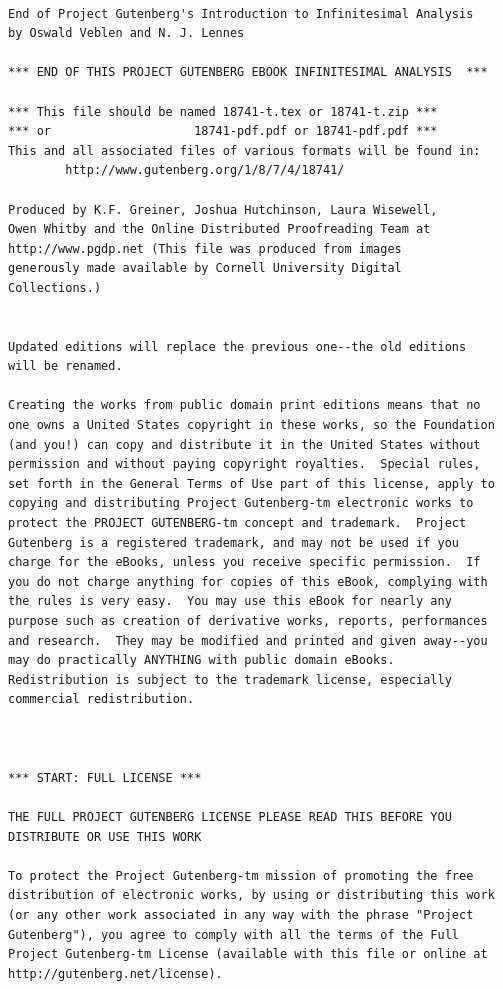 \documentclass[a4paper,12pt]{book}[2004/02/16]
\theoremstyle{ilemma}
\theoremstyle{itheorem}
\theoremstyle{iother}
\theoremstyle{icorollary}
\theoremstyle{numcorollary}
\theoremstyle{idefinition}
\begin{document}
\small
{}
\begin{verbatim}

End of Project Gutenberg's Introduction to Infinitesimal Analysis
by Oswald Veblen and N. J. Lennes

*** END OF THIS PROJECT GUTENBERG EBOOK INFINITESIMAL ANALYSIS  ***

*** This file should be named 18741-t.tex or 18741-t.zip ***
*** or                    18741-pdf.pdf or 18741-pdf.pdf ***
This and all associated files of various formats will be found in:
        http://www.gutenberg.org/1/8/7/4/18741/

Produced by K.F. Greiner, Joshua Hutchinson, Laura Wisewell, 
Owen Whitby and the Online Distributed Proofreading Team at 
http://www.pgdp.net (This file was produced from images 
generously made available by Cornell University Digital 
Collections.)


Updated editions will replace the previous one--the old editions
will be renamed.

Creating the works from public domain print editions means that no
one owns a United States copyright in these works, so the Foundation
(and you!) can copy and distribute it in the United States without
permission and without paying copyright royalties.  Special rules,
set forth in the General Terms of Use part of this license, apply to
copying and distributing Project Gutenberg-tm electronic works to
protect the PROJECT GUTENBERG-tm concept and trademark.  Project
Gutenberg is a registered trademark, and may not be used if you
charge for the eBooks, unless you receive specific permission.  If
you do not charge anything for copies of this eBook, complying with
the rules is very easy.  You may use this eBook for nearly any
purpose such as creation of derivative works, reports, performances
and research.  They may be modified and printed and given away--you
may do practically ANYTHING with public domain eBooks.
Redistribution is subject to the trademark license, especially
commercial redistribution.



*** START: FULL LICENSE ***

THE FULL PROJECT GUTENBERG LICENSE PLEASE READ THIS BEFORE YOU
DISTRIBUTE OR USE THIS WORK

To protect the Project Gutenberg-tm mission of promoting the free
distribution of electronic works, by using or distributing this work
(or any other work associated in any way with the phrase "Project
Gutenberg"), you agree to comply with all the terms of the Full
Project Gutenberg-tm License (available with this file or online at
http://gutenberg.net/license).



\end{verbatim}
\end{document}
